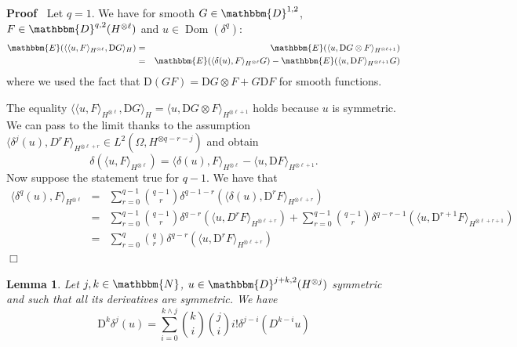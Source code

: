 \documentclass[a4paper,11pt]{article}
\newcommand{\mathD}{\mathrm{D}}
\newcommand{\tmop}[1]{\ensuremath{\operatorname{#1}}}
\newenvironment{proof}{\noindent\textbf{Proof\ }}{\hspace*{\fill}$\Box$\medskip}
\newtheorem{lemma}[theorem]{Lemma}
{\theorembodyfont{\rmfamily}\newtheorem{remark}[theorem]{Remark}}
\begin{document}
\begin{proof}
  Let $q = 1$. We have for smooth $G \in \mathbbm{D}^{1, 2}$, $F \in
  \mathbbm{D}^{q, 2} (H^{\otimes \ell})$ and $u \in \tmop{Dom} (\delta^q)$:
  \begin{eqnarray*}
    \mathbbm{E} (\langle \langle u, F \rangle_{H^{\otimes \ell}}, \mathD G
    \rangle_H) & = & \mathbbm{E} (\langle u, \mathD G \otimes F
    \rangle_{H^{\otimes \ell + 1}})\\
    & = & \mathbbm{E} (\langle \delta (u), F \rangle_{H^{\otimes \ell}} G)
    -\mathbbm{E} (\langle u, \mathD F \rangle_{H^{\otimes \ell + 1}} G)
  \end{eqnarray*}
  where we used the fact that $\mathD (GF) = \mathD G \otimes F + G \mathD F$
  for smooth functions. 
  
  The equality $\langle \langle u, F \rangle_{H^{\otimes
  \ell}}, \mathD G \rangle_H = \langle u, \mathD G \otimes F
  \rangle_{H^{\otimes \ell + 1}}$ holds because $u$ is symmetric.
  We can pass to the limit thanks to the assumption $\langle \delta^j (u),
  D^r F \rangle_{H^{\otimes \ell + r}} \in L^2 (\Omega, H^{\otimes q - r -
  j})$ and obtain
  \[ \delta (\langle u, F \rangle_{H^{\otimes \ell}}) = \langle \delta (u), F
     \rangle_{H^{\otimes \ell}} - \langle u, \mathD F \rangle_{H^{\otimes \ell
     + 1}} . \]
  Now suppose the statement true for $q - 1$. We have that \
  \begin{eqnarray*}
    \langle \delta^q (u), F \rangle_{H^{\otimes \ell}} & = & \sum_{r = 0}^{q -
    1} \binom{q - 1}{r} \delta^{q - 1 - r} (\langle \delta (u), \mathD^r F
    \rangle_{H^{\otimes \ell + r}})\\
    & = & \sum_{r = 0}^{q - 1} \binom{q - 1}{r} \delta^{q - r} (\langle u,
    D^r F \rangle_{H^{\otimes \ell + r}}) + \sum_{r = 0}^{q - 1} \binom{q -
    1}{r} \delta^{q - r - 1} (\langle u, \mathD^{r + 1} F \rangle_{H^{\otimes
    \ell + r + 1}})\\
    & = & \sum_{r = 0}^q \binom{q}{r} \delta^{q - r} (\langle u, \mathD^r F
    \rangle_{H^{\otimes \ell + r}})
  \end{eqnarray*}
\end{proof}

\begin{lemma}
  Let $j, k \in \mathbbm{N}$, $u \in \mathbbm{D}^{j + k, 2} (H^{\otimes j})$
  symmetric and such that all its derivatives are symmetric. We have
  \begin{equation}
    \mathD^k \delta^j (u) = \sum_{i = 0}^{k \wedge j} \binom{k}{i}
    \binom{j}{i} i! \delta^{j - i} (D^{k - i} u)  \label{e:Ddelta-comm}
  \end{equation}
\end{lemma}
\end{document}

